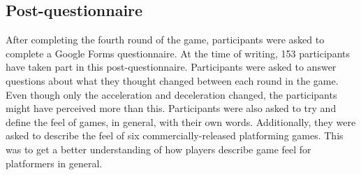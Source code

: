 


\subsection{Post-questionnaire}
After completing the fourth round of the game, participants were asked to complete a Google Forms questionnaire. At the time of writing, 153 participants have taken part in this post-questionnaire. Participants were asked to answer questions about what they thought changed between each round in the game. Even though only the acceleration and deceleration changed, the participants might have perceived more than this. Participants were also asked to try and define the feel of games, in general, with their own words. Additionally, they were asked to describe the feel of six commercially-released platforming games. This was to get a better understanding of how players describe game feel for platformers in general.


